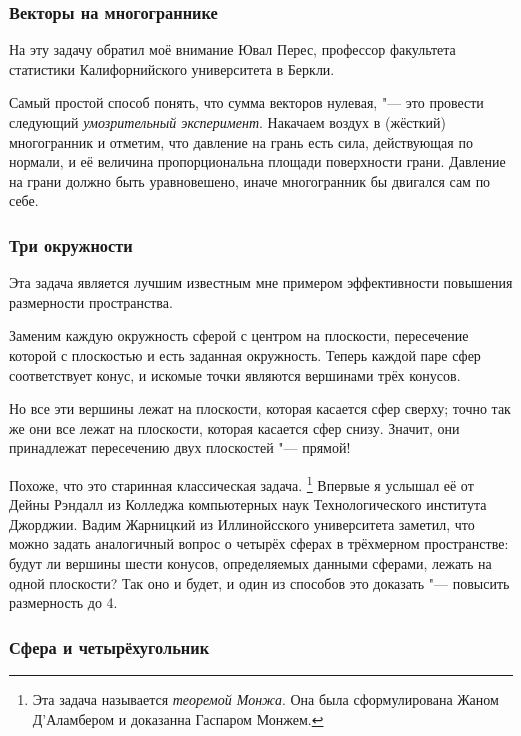 \documentclass[twoside]{book}
\begin{document}
\subsubsection*{Векторы на многограннике}%

На эту задачу обратил моё внимание Ювал Перес, профессор факультета статистики Калифорнийского университета в Беркли. %

\medskip
 
Самый простой способ понять, что сумма векторов нулевая, "--- это провести следующий \emph{умозрительный эксперимент}.
Накачаем воздух в (жёсткий) многогранник и отметим, что давление на грань есть сила, действующая по нормали, и её величина пропорциональна площади поверхности грани.
Давление на грани должно быть уравновешено, иначе многогранник бы двигался сам по себе.
\heart

\subsubsection*{Три окружности}%

Эта задача является лучшим известным мне примером эффективности повышения размерности пространства.

\medskip

Заменим каждую окружность сферой с центром на плоскости, пересечение которой с плоскостью и есть заданная окружность.
Теперь каждой паре сфер соответствует конус, и искомые точки являются вершинами трёх конусов. %

Но все эти вершины лежат на плоскости, которая касается сфер сверху;
точно так же они все лежат на плоскости, которая касается сфер снизу.
Значит, они принадлежат пересечению двух плоскостей "--- прямой! \heart

Похоже, что это старинная классическая задача.%
\footnote{Эта задача называется \emph{теоремой Монжа}. Она была сформулирована Жаном Д’Аламбером и доказанна Гаспаром Монжем.}
Впервые я услышал её от Дейны Рэндалл %
из Колледжа компьютерных наук Технологического института Джорджии.
Вадим Жарницкий из Иллинойсского университета заметил, что можно задать аналогичный вопрос о четырёх сферах в трёхмерном пространстве: будут ли вершины шести конусов, определяемых данными сферами, лежать на одной плоскости?
Так оно и будет, и один из способов это доказать "--- повысить размерность до 4.

\subsubsection*{Сфера и четырёхугольник}%
\end{document}

